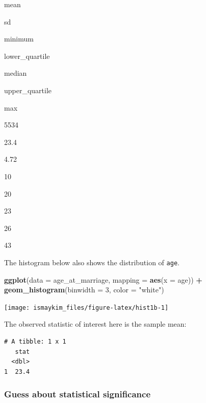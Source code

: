 \documentclass[12pt,]{krantz}
\makeatletter
\newenvironment{Shaded}{\begin{snugshade}}{\end{snugshade}}
\newcommand{\KeywordTok}[1]{\textcolor[rgb]{0.27,0.27,0.27}{\textbf{#1}}}
\newcommand{\DataTypeTok}[1]{\textcolor[rgb]{0.27,0.27,0.27}{#1}}
\newcommand{\DecValTok}[1]{\textcolor[rgb]{0.06,0.06,0.06}{#1}}
\newcommand{\StringTok}[1]{\textcolor[rgb]{0.5,0.5,0.5}{#1}}
\newcommand{\OperatorTok}[1]{\textcolor[rgb]{0.43,0.43,0.43}{\textbf{#1}}}
\newcommand{\NormalTok}[1]{#1}
\newenvironment{kframe}{%
\medskip{}
\setlength{\fboxsep}{.8em}
 \def\at@end@of@kframe{}%
 \ifinner\ifhmode%
  \def\at@end@of@kframe{\end{minipage}}%
  \begin{minipage}{\columnwidth}%
 \fi\fi%
 \def\FrameCommand##1{\hskip\@totalleftmargin \hskip-\fboxsep
 \colorbox{shadecolor}{##1}\hskip-\fboxsep
     \hskip-\linewidth \hskip-\@totalleftmargin \hskip\columnwidth}%
 \MakeFramed {\advance\hsize-\width
   \@totalleftmargin\z@ \linewidth\hsize
   \@setminipage}}%
 {\par\unskip\endMakeFramed%
 \at@end@of@kframe}
\renewenvironment{Shaded}{\begin{kframe}}{\end{kframe}}
\makeatother
\begin{document}
mean

sd

minimum

lower\_quartile

median

upper\_quartile

max

5534

23.4

4.72

10

20

23

26

43

The histogram below also shows the distribution of \texttt{age}.

\begin{Shaded}
\begin{Highlighting}[]
\KeywordTok{ggplot}\NormalTok{(}\DataTypeTok{data =}\NormalTok{ age_at_marriage, }\DataTypeTok{mapping =} \KeywordTok{aes}\NormalTok{(}\DataTypeTok{x =}\NormalTok{ age)) }\OperatorTok{+}
\StringTok{  }\KeywordTok{geom_histogram}\NormalTok{(}\DataTypeTok{binwidth =} \DecValTok{3}\NormalTok{, }\DataTypeTok{color =} \StringTok{"white"}\NormalTok{)}
\end{Highlighting}
\end{Shaded}

\begin{center}\texttt{[image: ismaykim\_files/figure-latex/hist1b-1]} \end{center}

The observed statistic of interest here is the sample mean:

\begin{Shaded}
\end{Shaded}

\begin{verbatim}
# A tibble: 1 x 1
   stat
  <dbl>
1  23.4
\end{verbatim}

\subsubsection*{Guess about statistical
significance}\label{guess-about-statistical-significance}
\end{document}
